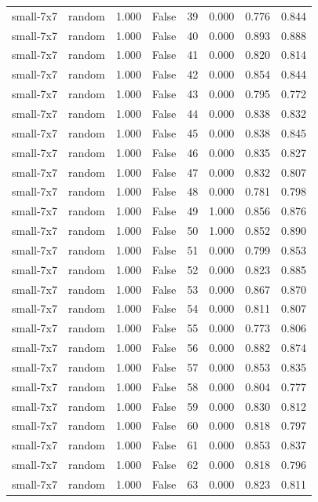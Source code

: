 \begin{tabular}{llrrrrrr}
small-7x7 & random & 1.000 & False & 39 & 0.000 & 0.776 & 0.844 \\
small-7x7 & random & 1.000 & False & 40 & 0.000 & 0.893 & 0.888 \\
small-7x7 & random & 1.000 & False & 41 & 0.000 & 0.820 & 0.814 \\
small-7x7 & random & 1.000 & False & 42 & 0.000 & 0.854 & 0.844 \\
small-7x7 & random & 1.000 & False & 43 & 0.000 & 0.795 & 0.772 \\
small-7x7 & random & 1.000 & False & 44 & 0.000 & 0.838 & 0.832 \\
small-7x7 & random & 1.000 & False & 45 & 0.000 & 0.838 & 0.845 \\
small-7x7 & random & 1.000 & False & 46 & 0.000 & 0.835 & 0.827 \\
small-7x7 & random & 1.000 & False & 47 & 0.000 & 0.832 & 0.807 \\
small-7x7 & random & 1.000 & False & 48 & 0.000 & 0.781 & 0.798 \\
small-7x7 & random & 1.000 & False & 49 & 1.000 & 0.856 & 0.876 \\
small-7x7 & random & 1.000 & False & 50 & 1.000 & 0.852 & 0.890 \\
small-7x7 & random & 1.000 & False & 51 & 0.000 & 0.799 & 0.853 \\
small-7x7 & random & 1.000 & False & 52 & 0.000 & 0.823 & 0.885 \\
small-7x7 & random & 1.000 & False & 53 & 0.000 & 0.867 & 0.870 \\
small-7x7 & random & 1.000 & False & 54 & 0.000 & 0.811 & 0.807 \\
small-7x7 & random & 1.000 & False & 55 & 0.000 & 0.773 & 0.806 \\
small-7x7 & random & 1.000 & False & 56 & 0.000 & 0.882 & 0.874 \\
small-7x7 & random & 1.000 & False & 57 & 0.000 & 0.853 & 0.835 \\
small-7x7 & random & 1.000 & False & 58 & 0.000 & 0.804 & 0.777 \\
small-7x7 & random & 1.000 & False & 59 & 0.000 & 0.830 & 0.812 \\
small-7x7 & random & 1.000 & False & 60 & 0.000 & 0.818 & 0.797 \\
small-7x7 & random & 1.000 & False & 61 & 0.000 & 0.853 & 0.837 \\
small-7x7 & random & 1.000 & False & 62 & 0.000 & 0.818 & 0.796 \\
small-7x7 & random & 1.000 & False & 63 & 0.000 & 0.823 & 0.811 \\

\end{tabular}
